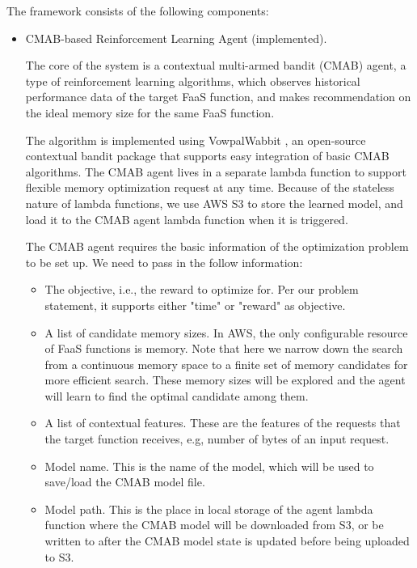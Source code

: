 \documentclass[conference]{IEEEtran}
\begin{document}
The framework consists of the following components:
\begin{itemize}


\item CMAB-based Reinforcement Learning Agent (implemented).

The core of the system is a contextual multi-armed bandit (CMAB) agent, a type of reinforcement learning algorithms, which observes historical performance data of the target FaaS function, and makes recommendation on the ideal memory size for the same FaaS function. 

The algorithm is implemented using VowpalWabbit \cite{vowpal-wabbit}, an open-source contextual bandit package that supports easy integration of basic CMAB algorithms. The CMAB agent lives in a separate lambda function to support flexible memory optimization request at any time. Because of the stateless nature of lambda functions, we use AWS S3 to store the learned model, and load it to the CMAB agent lambda function when it is triggered.

The CMAB agent requires the basic information of the optimization problem to be set up. We need to pass in the follow information: 
\begin{itemize}
    \item The objective, i.e., the reward to optimize for. Per our problem statement, it supports either "time" or "reward" as objective.
    \item A list of candidate memory sizes. In AWS, the only configurable resource of FaaS functions is memory. Note that here we narrow down the search from a continuous memory space to a finite set of memory candidates for more efficient search. These memory sizes will be explored and the agent will learn to find the optimal candidate among them.
    \item A list of contextual features. These are the features of the requests that the target function receives, e.g, number of bytes of an input request.
    \item Model name. This is the name of the model, which will be used to save/load the CMAB model file.
    \item Model path. This is the place in local storage of the agent lambda function where the CMAB model will be downloaded from S3, or be written to after the CMAB model state is updated before being uploaded to S3.
\end{itemize}


\end{itemize}
\end{document}
